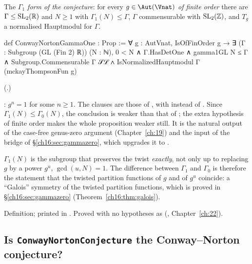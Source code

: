 \begin{definition}\label{ch16:def:gammaone}
The \emph{$\Gamma_1$ form of the conjecture}: for every $g\in\Aut(\Vnat)$ \emph{of finite order} there are
$\Gamma\le\mathrm{SL}_2(\mathbb{R})$ and $N\ge1$ with $\Gamma_1(N)\le\Gamma$, $\Gamma$ commensurable with $\mathrm{SL}_2(\mathbb{Z})$, and $T_g$
a normalised Hauptmodul for $\Gamma$.
\end{definition}
\begin{leancode}
def ConwayNortonGammaOne : Prop :=
  ∀ g : AutVnat, IsOfFinOrder g → ∃ (Γ : Subgroup (GL (Fin 2) ℝ)) (N : ℕ),
    0 < N ∧ Γ.HasDetOne ∧ gamma1GL N ≤ Γ ∧ Subgroup.Commensurable Γ 𝒮ℒ ∧
      IsNormalizedHauptmodul Γ (mckayThompsonFun g)
\end{leancode}
(.)
\begin{dictionary}
: $g^n=1$ for some $n\ge1$.  The clauses are those of , with
 instead of .  Since $\Gamma_1(N)\le\Gamma_0(N)$, the conclusion is weaker than that
of ; the extra hypothesis of finite order makes the whole proposition weaker still.  It is the
natural output of the case-free genus-zero argument (Chapter~\ref{ch:19}) and the input of the bridge of
\S\ref{ch16:sec:gammazero}, which upgrades it to .
\end{dictionary}
\begin{physics}
$\Gamma_1(N)$ is the subgroup that preserves the twist \emph{exactly}, not only up to replacing $g$ by a power
$g^u$, $\gcd(u,N)=1$.  The difference between $\Gamma_1$ and $\Gamma_0$ is therefore the statement that the twisted
partition functions of $g$ and of $g^u$ coincide: a ``Galois'' symmetry of the twisted partition functions, which is
proved in \S\ref{ch16:sec:gammazero} (Theorem~\ref{ch16:thm:galois}).
\end{physics}
\begin{status}
Definition; printed in .  Proved with no hypotheses as
 (, Chapter~\ref{ch:22}).
\end{status}

\subsection{Is \texttt{ConwayNortonConjecture} the Conway--Norton conjecture?}\label{ch16:sec:fidelity}


